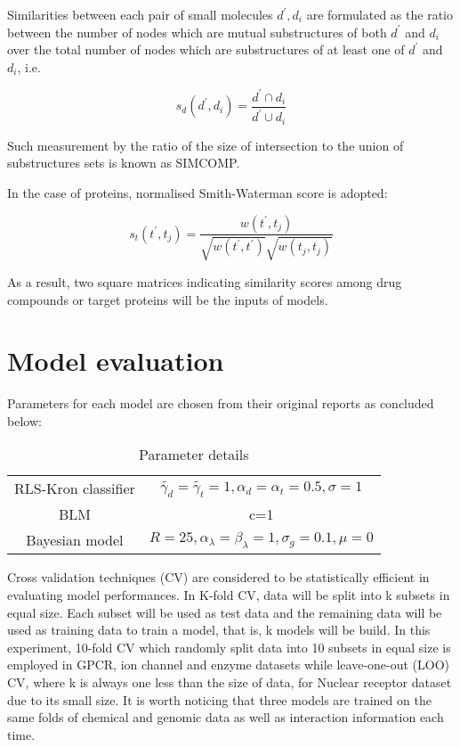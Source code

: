 \documentclass[a4paper,12pt]{report}
\begin{document}
Similarities between each pair of small molecules $d^{'}, d_i$ are formulated as the ratio between the number of nodes which are mutual substructures of both $d^{'}$ and $d_i$ over the total number of nodes which are substructures of at least one of $d^{'}$ and $d_i$, i.e.

\begin{equation}
s_d(d^{'}, d_i) = \frac{d^{'} \cap d_i}{d^{'} \cup d_i}
\end{equation}

Such measurement by the ratio of the size of intersection to the union of substructures sets is known as SIMCOMP\citep{hat03}.

In the case of proteins, normalised Smith-Waterman score\citep{sch98} is adopted:

\begin{equation}
s_t(t^{'}, t_j) = \frac{w(t^{'}, t_j)}{\sqrt{w(t^{'}, t^{'})}\sqrt{w(t_j,t_j)} }
\end{equation}

As a result, two square matrices indicating similarity scores among drug compounds or target proteins will be the inputs of models.
\section{Model evaluation}

Parameters for each model are chosen from their original reports as concluded below:
\begin{table}[h]
\centering
\begin{tabular}{cc}\hline
RLS-Kron classifier & $\tilde{\gamma_d} = \tilde{\gamma_t} = 1, \alpha_d = \alpha_t = 0.5, \sigma = 1$\\
BLM & c=1\\ 
Bayesian model & $R= 25, \alpha_{\lambda} = \beta_{\lambda} = 1, \sigma_g = 0.1, \mu = 0$ \\\hline
\end{tabular}
\caption{Parameter details}
\end{table}

Cross validation techniques (CV) are considered to be statistically efficient in evaluating model performances. In K-fold CV, data will be split into k subsets in equal size. Each subset will be used as test data and the remaining data will be used as training data to train a model, that is, k models will be build. In this experiment, 10-fold CV which randomly split data into 10 subsets in equal size is employed in GPCR, ion channel and enzyme datasets while leave-one-out (LOO) CV, where k is always one less than the size of data, for Nuclear receptor dataset due to its small size. It is worth noticing that three models are trained on the same folds of chemical and genomic data as well as interaction information each time. 
\end{document}
